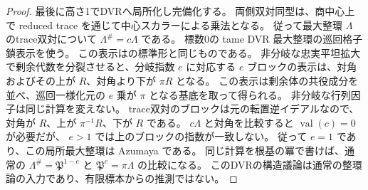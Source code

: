 \begin{proof}
最後に高さ1でDVRへ局所化し完備化する。
両側双対同型は、商中心上で reduced trace を通じて中心スカラーによる乗法となる。
従って最大整環 $\Lambda$ のtrace双対について $\Lambda^\#=c\Lambda$ である。
標数0の tame DVR 最大整環の巡回格子鎖表示を使う。
この表示は\cite[Definition 2.1直後]{CHIOrders}の標準形と同じものである。
非分岐な忠実平坦拡大で剰余代数を分裂させると、分岐指数 $e$ に対応する
$e$ ブロックの表示は、対角およびその上が $R$、対角より下が $\pi R$ となる。
この表示は剰余体の共役成分を並べ、巡回一様化元の $e$ 乗が $\pi$ となる基底を取って得られる。
非分岐な行列因子は同じ計算を変えない。
trace双対のブロックは元の転置逆イデアルなので、対角が $R$、上が $\pi^{-1}R$、下が $R$ である。
$c\Lambda$ と対角を比較すると $\operatorname{val}(c)=0$ が必要だが、
$e>1$ では上のブロックの指数が一致しない。
従って $e=1$ であり、この局所最大整環は Azumaya である。
同じ計算を根基の冪で書けば、通常の $\Lambda^\#=\mathfrak P^{1-e}$ と
$\mathfrak P^e=\pi\Lambda$ の比較になる。
このDVRの構造議論は通常の整環論の入力であり、有限標本からの推測ではない。
\end{proof}

